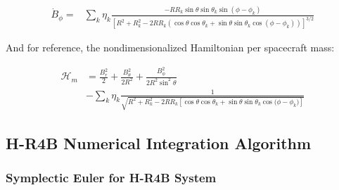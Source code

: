 \begin{equation} \tag{2.88}
    \boxed{
        \!\begin{aligned}
            \dot{B}_\phi = &\sum\limits_{k} \eta_k \frac{- R R_k \sin{\theta}\sin{\theta_k}\sin{(\phi - \phi_k)}}{\left[R^2 + R_k^2 - 2 R R_k \left(\cos{\theta}\cos{\theta_k} + \sin{\theta}\sin{\theta_k}\cos{(\phi - \phi_k)} \right) \right]^{3/2}}
        \end{aligned}
    }
\end{equation}

\vspace{0.2cm}
And for reference, the nondimensionalized Hamiltonian per spacecraft mass:

\begin{equation} \tag{2.105}
    \begin{aligned}
        \mathcal{H}_m &= \frac{B_r^2}{2} + \frac{B_\theta^2}{2 R^2} + \frac{B_\phi^2}{2 R^2 \sin^2{\theta}} \\
        &- \sum\limits_{k} \eta_k \frac{1}{\sqrt{R^2 + R_k^2 - 2 R R_k \left[\cos{\theta}\cos{\theta_k}+\sin{\theta}\sin{\theta_k}\cos{(\phi - \phi_k})\right]}}        
    \end{aligned}
\end{equation}

\subsection{H-R4B Numerical Integration Algorithm}

\subsubsection{Symplectic Euler for H-R4B System}

